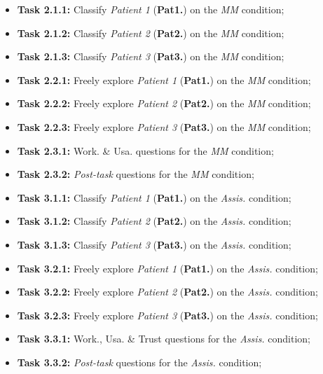 \hfill

\begin{itemize}
\item[] \textbf{Task 2.1.1:} Classify \textit{Patient 1} ({\bf Pat1.}) on the {\it \gls{MM}} condition;
\item[] \textbf{Task 2.1.2:} Classify \textit{Patient 2} ({\bf Pat2.}) on the {\it \gls{MM}} condition;
\item[] \textbf{Task 2.1.3:} Classify \textit{Patient 3} ({\bf Pat3.}) on the {\it \gls{MM}} condition;
\end{itemize}

\hfill

\begin{itemize}
\item[] \textbf{Task 2.2.1:} Freely explore \textit{Patient 1} ({\bf Pat1.}) on the {\it \gls{MM}} condition;
\item[] \textbf{Task 2.2.2:} Freely explore \textit{Patient 2} ({\bf Pat2.}) on the {\it \gls{MM}} condition;
\item[] \textbf{Task 2.2.3:} Freely explore \textit{Patient 3} ({\bf Pat3.}) on the {\it \gls{MM}} condition;
\end{itemize}

\hfill

\begin{itemize}
\item[] \textbf{Task 2.3.1:} Work. \& Usa. questions for the {\it \gls{MM}} condition;
\item[] \textbf{Task 2.3.2:} {\it Post-task} questions for the {\it \gls{MM}} condition;
\end{itemize}

\hfill

\begin{itemize}
\item[] \textbf{Task 3.1.1:} Classify \textit{Patient 1} ({\bf Pat1.}) on the \textit{Assis.} condition;
\item[] \textbf{Task 3.1.2:} Classify \textit{Patient 2} ({\bf Pat2.}) on the \textit{Assis.} condition;
\item[] \textbf{Task 3.1.3:} Classify \textit{Patient 3} ({\bf Pat3.}) on the \textit{Assis.} condition;
\end{itemize}

\hfill

\begin{itemize}
\item[] \textbf{Task 3.2.1:} Freely explore \textit{Patient 1} ({\bf Pat1.}) on the \textit{Assis.} condition;
\item[] \textbf{Task 3.2.2:} Freely explore \textit{Patient 2} ({\bf Pat2.}) on the \textit{Assis.} condition;
\item[] \textbf{Task 3.2.3:} Freely explore \textit{Patient 3} ({\bf Pat3.}) on the \textit{Assis.} condition;
\end{itemize}

\hfill

\begin{itemize}
\item[] \textbf{Task 3.3.1:} Work., Usa. \& Trust questions for the \textit{Assis.} condition;
\item[] \textbf{Task 3.3.2:} {\it Post-task} questions for the \textit{Assis.} condition;
\end{itemize}

\hfill

